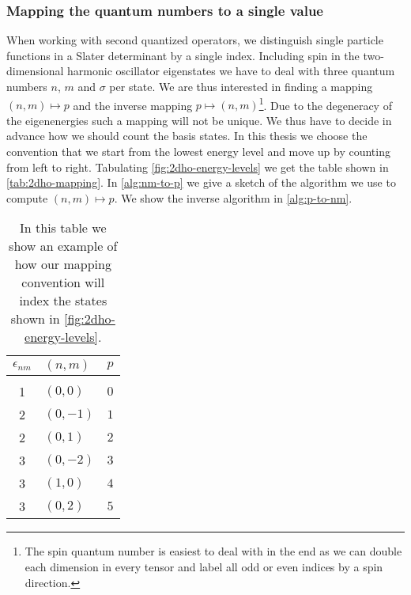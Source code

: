         \subsubsection{Mapping the quantum numbers to a single value}
            When working with second quantized operators, we distinguish single
            particle functions in a Slater determinant by a single index.
            Including spin in the two-dimensional harmonic oscillator
            eigenstates we have to deal with three quantum numbers $n$, $m$ and
            $\sigma$ per state.  We are thus interested in finding a mapping
            $(n, m) \mapsto p$ and the inverse mapping $p \mapsto (n,
            m)$\footnote{The spin quantum number is easiest to deal with in the
            end as we can double each dimension in every tensor and label all
            odd or even indices by a spin direction.}.  Due to the degeneracy of
            the eigenenergies such a mapping will not be unique. We thus have to
            decide in advance how we should count the basis states. In this
            thesis we choose the convention that we start from the lowest energy
            level and move up by counting from left to right. Tabulating
            \autoref{fig:2dho-energy-levels} we get the table shown in
            \autoref{tab:2dho-mapping}.  In \autoref{alg:nm-to-p} we give a
            sketch of the algorithm we use to compute $(n, m) \mapsto p$. We
            show the inverse algorithm in \autoref{alg:p-to-nm}.

            \begin{table}
                \centering
                \caption{In this table we show an example of how our mapping
                convention will index the states shown in
                \autoref{fig:2dho-energy-levels}.}
                \begin{tabular}{c|ll}
                    $\epsilon_{nm}$ & $(n, m)$ & $p$ \\
                    \hline
                    \\
                    1 & $(0, 0)$ & $0$ \\
                    2 & $(0, -1)$ & $1$ \\
                    2 & $(0, 1)$ & $2$ \\
                    3 & $(0, -2)$ & $3$ \\
                    3 & $(1, 0)$ & $4$ \\
                    3 & $(0, 2)$ & $5$
                \end{tabular}
                \label{tab:2dho-mapping}
            \end{table}

